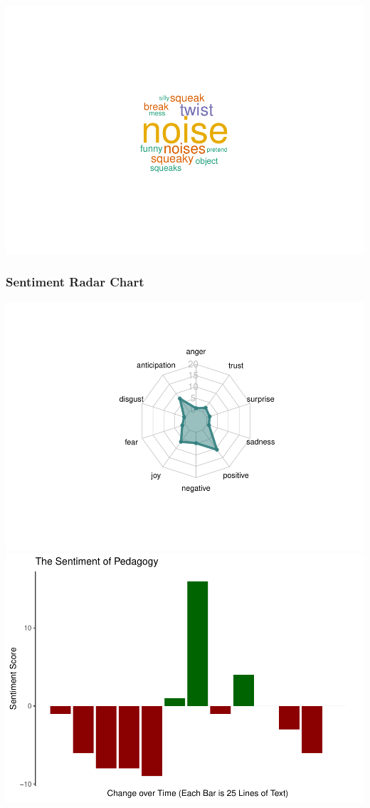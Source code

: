 \documentclass[
  english,
  man]{apa6}
\begin{document}
\includegraphics{capstone640_files/figure-latex/unnamed-chunk-3-1.pdf}

\hypertarget{sentiment-radar-chart}{%
\subsubsection{Sentiment Radar Chart}\label{sentiment-radar-chart}}

\includegraphics{capstone640_files/figure-latex/unnamed-chunk-4-1.pdf} \includegraphics{capstone640_files/figure-latex/unnamed-chunk-4-2.pdf}
\end{document}
